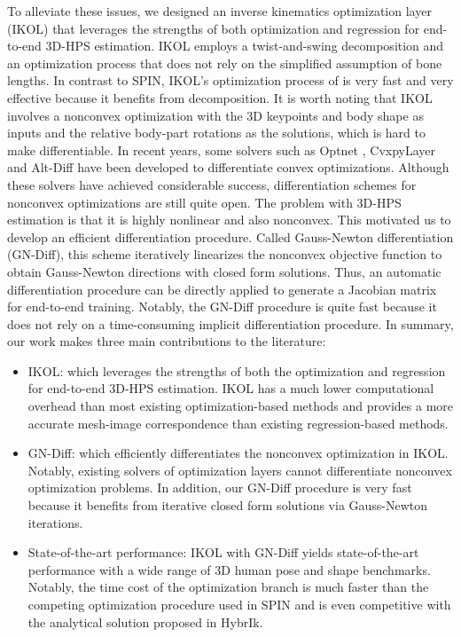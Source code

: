 \documentclass[letterpaper]{article} \usepackage{aaai23}  \usepackage{times}  \usepackage{helvet}  \usepackage{courier}  \usepackage[hyphens]{url}  \usepackage{graphicx} \urlstyle{rm} \def\UrlFont{\rm}  \usepackage{natbib}  \usepackage{caption} \frenchspacing  \setlength{\pdfpagewidth}{8.5in}  \setlength{\pdfpageheight}{11in}  \usepackage{algorithm}
\begin{document}
To alleviate these issues, we designed an inverse kinematics optimization layer (IKOL) that leverages the strengths of both optimization and regression for end-to-end 3D-HPS estimation. IKOL employs a twist-and-swing decomposition and an optimization process that does not rely on the simplified assumption of bone lengths. In contrast to SPIN, IKOL’s optimization process of is very fast and very effective because it benefits from decomposition. It is worth noting that IKOL involves a nonconvex optimization with the 3D keypoints and body shape as inputs and the relative body-part rotations as the solutions, which is hard to make differentiable. In recent years, some solvers such as Optnet \cite{amos2017optnet}, CvxpyLayer \cite{agrawal2019differentiable} and Alt-Diff \cite{sun2022alternating} have been developed to differentiate convex optimizations. Although these solvers have achieved considerable success, differentiation schemes for nonconvex optimizations are still quite open. The problem with 3D-HPS estimation is that it is highly nonlinear and also nonconvex. This motivated us to develop an efficient differentiation procedure. Called Gauss-Newton differentiation (GN-Diff), this scheme iteratively linearizes the nonconvex objective function to obtain Gauss-Newton directions with closed form solutions. Thus, an automatic differentiation procedure can be directly applied to generate a Jacobian matrix for end-to-end training. Notably, the GN-Diff procedure is quite fast because it does not rely on a time-consuming implicit differentiation procedure. In summary, our work makes three main contributions to the literature: 
\begin{itemize}
\item IKOL: which leverages the strengths of both the optimization and regression for end-to-end 3D-HPS estimation. IKOL has a much lower computational overhead than most existing optimization-based methods and provides a more accurate mesh-image correspondence than existing regression-based methods. 
\item GN-Diff: which efficiently differentiates the nonconvex optimization in IKOL. Notably, existing solvers of optimization layers cannot differentiate nonconvex optimization problems. In addition, our GN-Diff procedure is very fast because it benefits from iterative closed form solutions via Gauss-Newton iterations. 
\item State-of-the-art performance: IKOL with GN-Diff yields state-of-the-art performance with a wide range of 3D human pose and shape benchmarks. Notably, the time cost of the optimization branch is much faster than the competing optimization procedure used in SPIN and is even competitive with the analytical solution proposed in HybrIk. 
\end{itemize}
\end{document}
